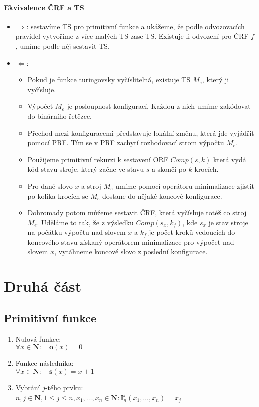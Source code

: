 \documentclass[a4paper]{article}      %
\begin{document}
\paragraph{Ekvivalence ČRF a TS}
\begin{itemize}
	\item $\Rightarrow$: sestavíme TS pro primitivní funkce a ukážeme, že podle odvozovacích pravidel vytvoříme z více malých TS zase TS.
	Existuje-li odvození pro ČRF $f$, umíme podle něj sestavit TS.
	\item $\Leftarrow$:
		\begin{itemize}
			\item Pokud je funkce turingovsky vyčíslitelná, existuje TS $M_{e}$, který ji vyčísluje.
			\item Výpočet $M_{e}$ je posloupnost konfigurací. Každou z nich umíme zakódovat do binárního řetězce.
			\item Přechod mezi konfiguracemi představuje lokální změnu, která jde vyjádřit pomocí PRF.
			Tím se v PRF zachytí rozhodovací strom výpočtu $M_{e}$. 
			\item Použijeme primitivní rekurzi k sestavení ORF $Comp(s,k)$ která vydá kód stavu stroje,
			který začne ve stavu $s$ a skončí po $k$ krocích. 
			\item Pro dané slovo $x$ a stroj $M_{e}$ umíme pomocí operátoru minimalizace zjistit po kolika krocích se
			$M_{e}$ dostane do nějaké koncové konfigurace.
			\item Dohromady potom můžeme sestavit ČRF, která vyčísluje totéž co stroj $M_{e}$. Uděláme to tak, že z výsledku
			$Comp(s_{x},k_{f})$, kde $s_{x}$ je stav stroje na počátku výpočtu nad slovem $x$ a
			$k_{f}$ je počet kroků vedoucích do koncového stavu získaný operátorem minimalizace pro výpočet nad slovem $x$,
			vytáhneme koncové slovo z poslední konfigurace.  
		\end{itemize}
\end{itemize}

\section{Druhá část}

\subsection{Primitivní funkce}
\begin{enumerate}
\item Nulová funkce:\\
$\forall x \in \mathbf{N}: \quad \mathbf{o}(x) = 0$
\item Funkce následníka:\\
$\forall x \in \mathbf{N}: \quad \mathbf{s}(x) = x + 1$
\item Vybrání $j$-tého prvku:\\
$n,j \in \mathbf{N}, 1 \leq j \leq n, x_{1},\ldots,x_{n}\in \mathbf{N}: \mathbf{I}_{n}^{j}(x_{1},\ldots,x_{n}) = x_{j}$
\end{enumerate}
\end{document}
